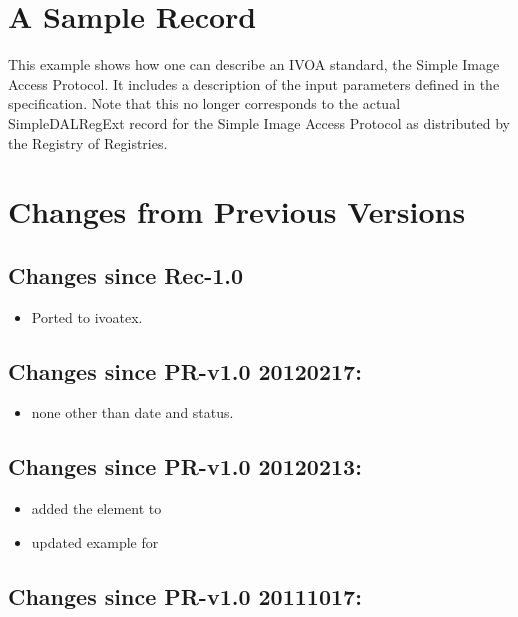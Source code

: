 \documentclass[11pt,a4paper]{ivoa}
\begin{document}
\section{A Sample Record}
\label{app:fullrecord}

This example shows how one can describe an IVOA standard, the Simple
Image Access Protocol.  It includes a description of the input parameters
defined in the specification.  Note that this no longer corresponds to
the actual SimpleDALRegExt record for the Simple Image Access Protocol
as distributed by the Registry of Registries.



\section{Changes from Previous Versions}

\subsection{Changes since Rec-1.0}

\begin{itemize}
\item Ported to ivoatex.
\end{itemize}

\subsection{Changes since PR-v1.0 20120217:}

\begin{itemize}
\item  none other than date and status.
\end{itemize}

\subsection{Changes since PR-v1.0 20120213:}

\begin{itemize}
\item  added the  element to

\item  updated example for 

\end{itemize}

\subsection{Changes since PR-v1.0 20111017:}
\end{document}
